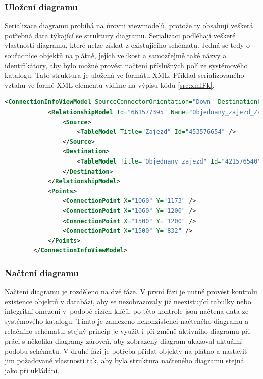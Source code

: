 \documentclass[czech,bachelor,public,dept460,male,oneside]{diploma}
\begin{document}
		\subsubsection{Uložení diagramu}
		Serializace diagramu probíhá na úrovni viewmodelů, protože ty obsahují veškerá potřebná data týkající se struktury diagramu. Serializaci podléhají veškeré vlastnosti diagramu, které nelze získat z existujícího schématu. Jedná se tedy o souřadnice objektů na plátně, jejich velikost a samozřejmě také názvy a identifikátory, aby bylo možné provést načtení příslušných polí ze systémového katalogu. Tato struktura je uložená ve formátu XML. Příklad serializovaného vztahu ve formě XML elementu vidíme na výpisu kódu \ref{src:xmlFk}.
		
		\begin{lstlisting}[language=xml,label=src:xmlFk,caption=Serializovaný vztah ve formátu XML]
		<ConnectionInfoViewModel SourceConnectorOrientation="Down" DestinationConnectorOrientation="Down">
			<RelationshipModel Id="661577395" Name="Objednany_zajezd_Zajezd_FK" LastModified="2017-01-21T15:17:53.68">
				<Source>
					<TableModel Title="Zajezd" Id="453576654" />
				</Source>
				<Destination>
					<TableModel Title="Objednany_zajezd" Id="421576540" />
				</Destination>
			</RelationshipModel>
			<Points>
				<ConnectionPoint X="1060" Y="1173" />
				<ConnectionPoint X="1060" Y="1200" />
				<ConnectionPoint X="1500" Y="1200" />
				<ConnectionPoint X="1500" Y="832" />
			</Points>
		</ConnectionInfoViewModel>
		\end{lstlisting}
		
		\subsubsection{Načtení diagramu}
		Načtení diagramu je rozděleno na dvě fáze. V první fázi je nutné provést kontrolu existence objektů v databázi, aby se nezobrazovaly již neexistující tabulky nebo integritní omezení v~podobě cizích klíčů, po této kontrole jsou načtena data ze systémového katalogu. Tímto je zamezeno nekonzistenci načteného diagramu a relačního schématu, stejný princip je využit i při změně aktivního diagramu při práci s několika diagramy zároveň, aby zobrazený diagram ukazoval aktuální podobu schématu. V druhé fázi je potřeba přidat objekty na plátno a nastavit jim požadované vlastnosti tak, aby byla struktura načteného diagramu stejná jako při ukládání.

\newpage
\end{document}
